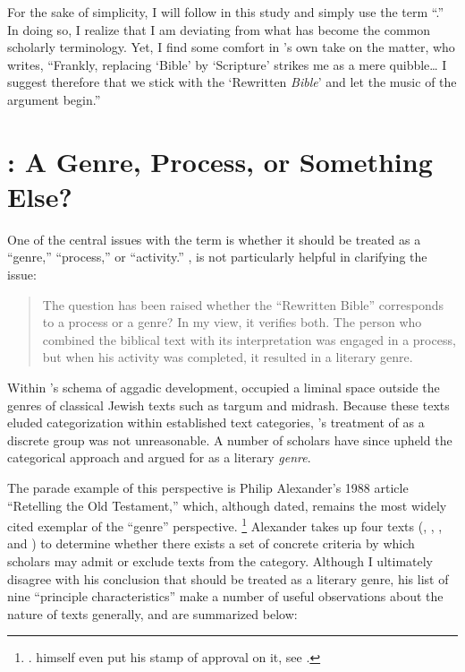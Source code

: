 For the sake of simplicity, I will follow \vermes in this study and simply use the term ``\rwb.'' In doing so, I realize that I am deviating from what has become the common scholarly terminology. Yet, I find some comfort in \vermes's own take on the matter, who writes, ``Frankly, replacing `Bible' by `Scripture' strikes me as a mere quibble\ldots{} I suggest therefore that we stick with the `Rewritten \emph{Bible}' and let the music of the argument begin.''%
    \autocite[original emphasis]{vermes_zsengeller2014} 

\section{\rwb: A Genre, Process, or Something Else?}

 One of the central issues with the term \rwb is whether it should be treated as a ``genre,'' ``process,'' or ``activity.'' \vermes, is not particularly helpful in clarifying the issue: 

\begin{quote}
    The question has been raised whether the ``Rewritten Bible'' corresponds to a process or a genre? In my view, it verifies both. The person who combined the biblical text with its interpretation was engaged in a process, but when his activity was completed, it resulted in a literary genre.%
    \autocite[8]{vermes_zsengeller2014}
\end{quote} 
\noindent
Within \vermes's schema of aggadic development, \rwb occupied a liminal space outside the genres of classical Jewish texts such as targum and midrash. Because these texts eluded categorization within established text categories, \vermes's treatment of \rwb as a discrete group was not unreasonable. A number of scholars have since upheld the categorical approach and argued for \rwb as a literary \emph{genre}. 

The parade example of this perspective is Philip Alexander's 1988 article ``Retelling the Old Testament,'' which, although dated, remains the most widely cited exemplar of the ``genre'' perspective.%
    \footnote{%
        \Cite{alexander_carson-williamson1988}.
        \vermes himself even put his stamp of approval on it, see
        \cite[4]{vermes_zsengeller2014}.}
Alexander takes up four \rwb texts (\jub, \ga, \lab, and \antiquities) to determine whether there exists a set of concrete criteria by which scholars may admit or exclude texts from the category. Although I ultimately disagree with his conclusion that \rwb should be treated as a literary genre, his list of nine ``principle characteristics'' make a number of useful observations about the nature of \rwb texts generally, and are summarized below: 

